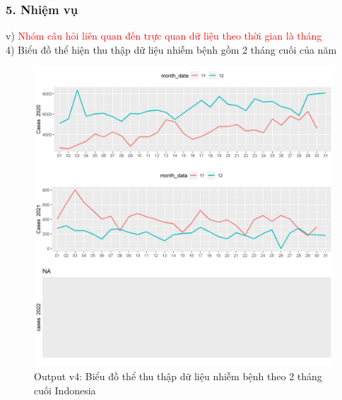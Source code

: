 \documentclass[english,10pt,table]{beamer}
\begin{document}
\begin{frame}[fragile]
\frametitle{5.  Nhiệm vụ}
v) \textcolor{red}{Nhóm câu hỏi liên quan đến trực quan dữ liệu theo thời gian là tháng}\\
    4) Biểu đồ thể hiện thu thập dữ liệu nhiễm bệnh gồm 2 tháng cuối của năm
	\begin{figure}[h!]
	\begin{center}
		    \includegraphics[scale = 0.25]{Images/V/v4 Indonesia .jpeg}
		     \caption{Output v4: Biểu đồ thể thu thập dữ liệu nhiễm bệnh theo 2 tháng cuối Indonesia}
		\end{center}
		\end{figure}
\end{frame}
\end{document}
